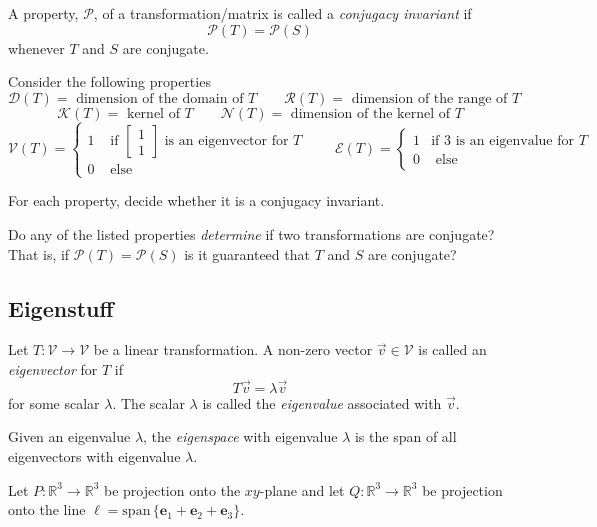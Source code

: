 \documentclass[14pt]{problemset}
\newcommand{\xh}{{{\mathbf e}_1}}
\newcommand{\yh}{{{\mathbf e}_2}}
\newcommand{\zh}{{{\mathbf e}_3}}
\newcommand{\R}{\mathbb{R}}
\newcommand{\Span}{\mathrm{span}\,}
\newcommand{\mat}[1]{\begin{bmatrix}#1\end{bmatrix}}
\begin{document}
	\begin{definition}
		A property, $\mathscr P$, of a transformation/matrix is called
		a \emph{conjugacy invariant} if
		\[
			\mathscr P(T)=\mathscr P(S)
		\]
		whenever $T$ and $S$ are conjugate.
	\end{definition}

	\question
	Consider the following properties
	\[
		\mathscr D(T)=\text{ dimension of the domain of $T$}
		\qquad
		\mathscr R(T)=\text{ dimension of the range of $T$}
	\]
	\[
		\mathscr K(T)=\text{ kernel of $T$}
		\qquad
		\mathscr N(T)=\text{ dimension of the kernel of $T$}
	\]
	\[
		\mathscr V(T)=\begin{cases}1&\text{ if $\mat{1\\1}$ is an eigenvector for $T$}\\0& \text{ else}\end{cases}
			\qquad
		\mathscr E(T)=\begin{cases}
			1&\text{if $3$ is an eigenvalue for $T$}\\0&\text{ else}
		\end{cases}
	\]
	\begin{parts}
		\item For each property, decide whether it is a conjugacy invariant.
		\item Do any of the listed properties \emph{determine} if two transformations
			are conjugate? That is, if $\mathscr P(T)=\mathscr P(S)$ is it guaranteed
			that $T$ and $S$ are conjugate?
	\end{parts}

	\subsection*{Eigenstuff}

	\begin{definition}
		Let $T:\mathcal V\to\mathcal V$ be a linear transformation. A non-zero
		vector $\vec v\in\mathcal V$ is called an \emph{eigenvector} for $T$
		if
		\[
			T\vec v=\lambda \vec v
		\]
		for some scalar $\lambda$. The scalar $\lambda$ is called the \emph{eigenvalue}
		associated with $\vec v$.

		Given an eigenvalue $\lambda$, the \emph{eigenspace} with eigenvalue $\lambda$
		is the span of all eigenvectors with eigenvalue $\lambda$.
	\end{definition}

	\question
	Let $P:\R^3\to\R^3$ be projection onto the $xy$-plane and let $Q:\R^3\to\R^3$ be projection
	onto the line $\ell=\Span\{\xh+\yh+\zh\}$.
\end{document}
